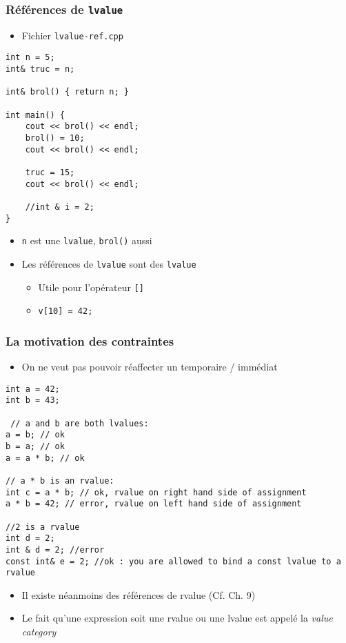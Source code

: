 \begin{frame}[containsverbatim]
\frametitle{Références de \texttt{lvalue}}
\begin{itemize}
\item Fichier \texttt{lvalue-ref.cpp}
\end{itemize}
\begin{lstlisting}
int n = 5;
int& truc = n;

int& brol() { return n; }

int main() {
	cout << brol() << endl;
	brol() = 10;
	cout << brol() << endl;

	truc = 15;
	cout << brol() << endl;

	//int & i = 2;
}
\end{lstlisting}
\begin{itemize}
\item \texttt{n} est une \texttt{lvalue}, \texttt{brol()} aussi
\item Les références de \texttt{lvalue} sont des \texttt{lvalue}
	\begin{itemize}
	\item Utile pour l'opérateur \texttt{[]}
	\item \texttt{v[10] = 42;}
	\end{itemize}
\end{itemize}
\end{frame}

\begin{frame}[containsverbatim]
\frametitle{La motivation des contraintes}
\begin{itemize}
\item On ne veut pas pouvoir réaffecter un temporaire / immédiat
\end{itemize}
\begin{lstlisting}
int a = 42;
int b = 43;

 // a and b are both lvalues:
a = b; // ok
b = a; // ok
a = a * b; // ok

// a * b is an rvalue:
int c = a * b; // ok, rvalue on right hand side of assignment
a * b = 42; // error, rvalue on left hand side of assignment

//2 is a rvalue
int d = 2;
int & d = 2; //error
const int& e = 2; //ok : you are allowed to bind a const lvalue to a rvalue
\end{lstlisting}
\begin{itemize}
\item Il existe néanmoins des références de rvalue (Cf. Ch. 9)
\item Le fait qu'une expression soit une rvalue ou une lvalue est appelé la \emph{value category}
\end{itemize}
\end{frame}

